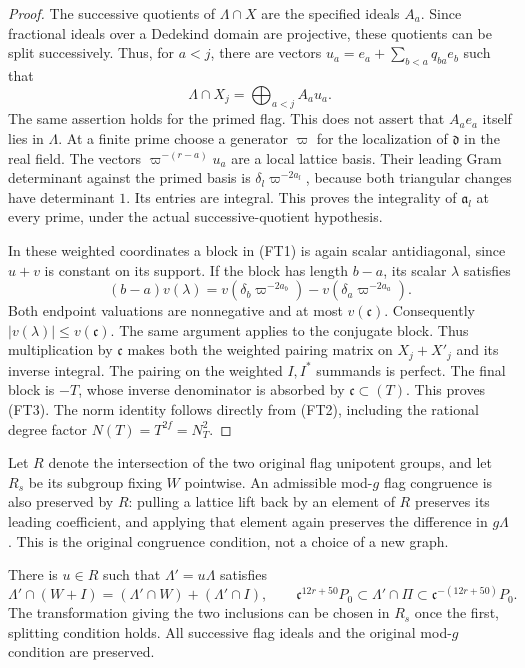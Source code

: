 \begin{proof}
The successive quotients of $\Lambda\cap X$ are the
specified ideals $A_a$.  Since fractional ideals over a
Dedekind domain are projective, these quotients can be split
successively.  Thus, for $a<j$, there are vectors
$u_a=e_a+\sum_{b<a}q_{ba}e_b$ such that
\[
                  \Lambda\cap X_j=\bigoplus_{a<j}A_au_a.
 \tag{FT4}
\]
The same assertion holds for the primed flag.  This does
not assert that $A_ae_a$ itself lies in $\Lambda$.
At a finite prime choose a generator $\varpi$ for the
localization of $\mathfrak d$ in the real field.  The
vectors $\varpi^{-(r-a)}u_a$ are a local lattice basis.
Their leading Gram determinant against the primed basis is
$\delta_l\varpi^{-2a_l}$, because both triangular changes
have determinant $1$.  Its entries are integral.  This
proves the integrality of $\mathfrak a_l$ at every prime,
under the actual successive-quotient hypothesis.

In these weighted coordinates a block in (FT1) is again
scalar antidiagonal, since $u+v$ is constant on its support.
If the block has length $b-a$, its scalar $\lambda$ satisfies
\[
 (b-a)v(\lambda)=
       v(\delta_b\varpi^{-2a_b})-
       v(\delta_a\varpi^{-2a_a}).
\]
Both endpoint valuations are nonnegative and at most
$v(\mathfrak c)$.  Consequently
$|v(\lambda)|\leq v(\mathfrak c)$.
The same argument applies to the conjugate block.  Thus
multiplication by $\mathfrak c$ makes both the weighted
pairing matrix on $X_j+X'_j$ and its inverse integral.
The pairing on the weighted $I,I^*$ summands is perfect.
The final block is $-T$, whose inverse denominator is
absorbed by $\mathfrak c\subset(T)$.  This proves (FT3).
The norm identity follows directly from (FT2), including
the rational degree factor $N(T)=T^{2f}=N_T^2$.
\end{proof}

Let $R$ denote the intersection of the two original flag
unipotent groups, and let $R_s$ be its subgroup fixing $W$
pointwise.  An admissible mod-$g$ flag congruence is also
preserved by $R$: pulling a lattice lift back by an element
of $R$ preserves its leading coefficient, and applying that
element again preserves the difference in $g\Lambda$.
This is the original congruence condition, not a choice of
a new graph.

\begin{theorem}
\label{thm:flag-lattice-near-representative}
There is $u\in R$ such that $\Lambda'=u\Lambda$ satisfies
\[
 \Lambda'\cap(W+I)=(\Lambda'\cap W)+(\Lambda'\cap I),
 \qquad
 \mathfrak c^{12r+50}P_0\subset\Lambda'\cap\Pi
                  \subset\mathfrak c^{-(12r+50)}P_0.
 \tag{FT5}
\]
The transformation giving the two inclusions can be chosen
in $R_s$ once the first, splitting condition holds.  All
successive flag ideals and the original mod-$g$ condition
are preserved.
\end{theorem}

